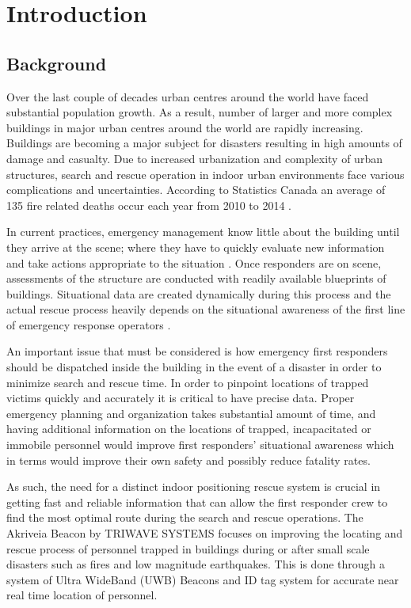 
\setcounter{section}{0}
\section{Introduction}
\bigskip

\subsection{Background}
Over the last couple of decades urban centres around the world have faced substantial population growth. As a result, number of larger and more complex buildings in major urban centres around the world are rapidly increasing. Buildings are becoming a major subject for disasters resulting in high amounts of damage and casualty. Due to increased urbanization and complexity of urban structures, search and rescue operation in indoor urban environments face various complications and uncertainties. According to Statistics Canada an average of 135 fire related deaths occur each year from 2010 to 2014 \cite{R1}.

\bigskip
In current practices, emergency management know little about the building until they arrive at the scene; where they have to quickly evaluate new information and take actions appropriate to the situation \cite{R2}. Once responders are on scene, assessments of the structure are conducted with readily available blueprints of buildings. Situational data are created dynamically during this process and the actual rescue process heavily depends on the situational awareness of the first line of emergency response operators \cite{R3}.

\bigskip
An important issue that must be considered is how emergency first responders should be dispatched inside the building in the event of a disaster in order to minimize search and rescue time. In order to pinpoint locations of trapped victims quickly and accurately it is critical to have precise data. Proper emergency planning and organization takes substantial amount of time, and having additional information on the locations of trapped, incapacitated or immobile personnel would improve first responders’ situational awareness which in terms would improve their own safety and possibly reduce fatality rates.

\bigskip
As such, the need for a distinct indoor positioning rescue system is crucial in getting fast and reliable information that can allow the first responder crew to find the most optimal route during the search and rescue operations. The Akriveia Beacon by TRIWAVE SYSTEMS focuses on improving the locating and rescue process of personnel trapped in buildings during or after small scale disasters such as fires and low magnitude earthquakes. This is done through a system of Ultra WideBand (\Gls{UWB}) Beacons and \Gls{ID} tag system for accurate near real time location of personnel.

